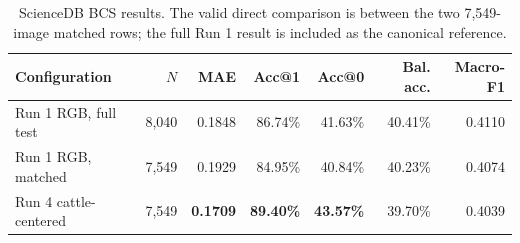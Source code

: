 \begin{table}[htbp]
\centering\small
\caption[BCS RGB and cattle-centered comparison]{ScienceDB BCS results. The valid direct comparison is between the two 7,549-image matched rows; the full Run 1 result is included as the canonical reference.}
\label{tab:bcscomparison}
\begin{tabular}{lrrrrrr}
\toprule
Configuration & $N$ & MAE & Acc@1 & Acc@0 & Bal. acc. & Macro-F1 \\
\midrule
Run 1 RGB, full test & 8,040 & 0.1848 & 86.74\% & 41.63\% & 40.41\% & 0.4110 \\
Run 1 RGB, matched & 7,549 & 0.1929 & 84.95\% & 40.84\% & 40.23\% & 0.4074 \\
Run 4 cattle-centered & 7,549 & \textbf{0.1709} & \textbf{89.40\%} & \textbf{43.57\%} & 39.70\% & 0.4039 \\
\bottomrule
\end{tabular}
\end{table}
